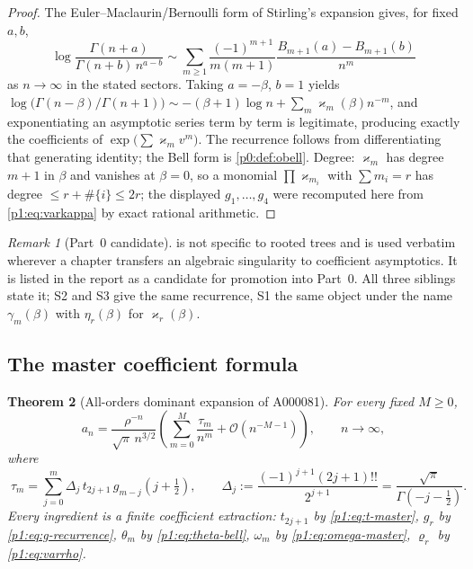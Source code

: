 \documentclass[11pt,a4paper,oneside]{book}
\theoremstyle{plain}
\newtheorem{theorem}{Theorem}[chapter]
\theoremstyle{definition}
\theoremstyle{remark}
\newtheorem{remark}[theorem]{Remark}
\newcommand{\bigO}{\mathcal{O}}
\begin{document}
\begin{proof}
The Euler--Maclaurin/Bernoulli form of Stirling's expansion gives, for fixed $a,b$,
\[
\log\frac{\Gamma(n+a)}{\Gamma(n+b)\,n^{a-b}} \sim\sum_{m\ge1}\frac{(-1)^{m+1}}{m(m+1)}
\frac{B_{m+1}(a)-B_{m+1}(b)}{n^{m}}
\]
as $n\to\infty$ in the stated sectors.  Taking $a=-\beta$, $b=1$ yields
$\log\bigl(\Gamma(n-\beta)/\Gamma(n+1)\bigr)\sim-(\beta+1)\log n
+\sum_m\varkappa_m(\beta)n^{-m}$, and exponentiating an asymptotic series term by term is
legitimate, producing exactly the coefficients of $\exp\bigl(\sum\varkappa_mv^m\bigr)$.  The
recurrence follows from differentiating that generating identity; the Bell form is
\cref{p0:def:obell}. Degree: $\varkappa_m$ has degree $m+1$ in $\beta$ and vanishes at
$\beta=0$, so a monomial $\prod\varkappa_{m_i}$ with $\sum m_i=r$ has degree $\le
r+\#\{i\}\le2r$; the displayed $g_1,\ldots,g_4$ were recomputed here from
\cref{p1:eq:varkappa} by exact rational arithmetic.
\end{proof}

\begin{remark}[Part~0 candidate]
\label{p1:rem:gamma-part0}
 is not specific to rooted trees and is used verbatim wherever a
chapter transfers an algebraic singularity to coefficient asymptotics.  It is listed in the
report as a candidate for promotion into Part~0.  All three siblings state it; \textsf{S2} and
\textsf{S3} give the same recurrence, \textsf{S1} the same object under the name
$\gamma_m(\beta)$ with $\eta_r(\beta)$ for $\varkappa_r(\beta)$.
\end{remark}

\subsection{The master coefficient formula}

\begin{theorem}[All-orders dominant expansion of A000081]
\label{p1:thm:forward}
For every fixed $M\ge0$,
\begin{equation}
 \boxed{\;
 a_n=\frac{\rho^{-n}}{\sqrt{\pi}\,n^{3/2}}
 \left(\sum_{m=0}^{M}\frac{\tau_m}{n^{m}}+\bigO(n^{-M-1})\right),
 \qquad n\to\infty,\;}
 \label{p1:eq:forward}
\end{equation}
where
\begin{equation}
 \boxed{\;
 \tau_m=\sum_{j=0}^{m}\Delta_j\,t_{2j+1}\,
 g_{m-j}\!\left(j+\tfrac12\right),
 \qquad
 \Delta_j:=\frac{(-1)^{j+1}(2j+1)!!}{2^{j+1}}
 =\frac{\sqrt\pi}{\Gamma(-j-\tfrac12)} .\;}
 \label{p1:eq:tau-master}
\end{equation}
Every ingredient is a finite coefficient extraction: $t_{2j+1}$ by \cref{p1:eq:t-master},
$g_r$ by \cref{p1:eq:g-recurrence}, $\theta_m$ by \cref{p1:eq:theta-bell}, $\omega_m$ by
\cref{p1:eq:omega-master}, $\varrho_r$ by \cref{p1:eq:varrho}.
\end{theorem}
\end{document}
